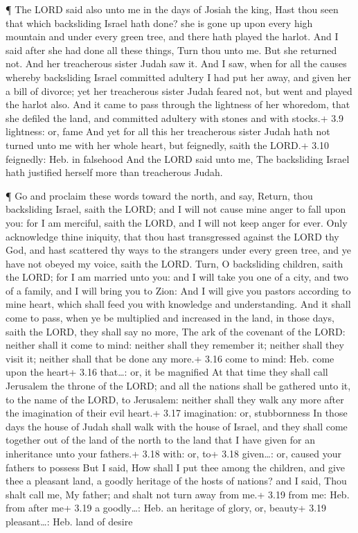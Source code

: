  ¶ The LORD said also unto me in the days of Josiah the
king, Hast thou seen that which backsliding Israel hath done? she is
gone up upon every high mountain and under every green tree, and there
hath played the harlot.  And I said after she had done all
these things, Turn thou unto me. But she returned not. And her
treacherous sister Judah saw it.  And I saw, when for all
the causes whereby backsliding Israel committed adultery I had put her
away, and given her a bill of divorce; yet her treacherous sister Judah
feared not, but went and played the harlot also.  And it
came to pass through the lightness of her whoredom, that she defiled the
land, and committed adultery with stones and with stocks.+ 3.9
lightness: or, fame  And yet for all this her treacherous
sister Judah hath not turned unto me with her whole heart, but
feignedly, saith the LORD.+ 3.10 feignedly: Heb. in falsehood
 And the LORD said unto me, The backsliding Israel hath
justified herself more than treacherous Judah.

 ¶ Go and proclaim these words toward the north, and say,
Return, thou backsliding Israel, saith the LORD; and I will not cause
mine anger to fall upon you: for I am merciful, saith the LORD, and I
will not keep anger for ever.  Only acknowledge thine
iniquity, that thou hast transgressed against the LORD thy God, and hast
scattered thy ways to the strangers under every green tree, and ye have
not obeyed my voice, saith the LORD.  Turn, O backsliding
children, saith the LORD; for I am married unto you: and I will take you
one of a city, and two of a family, and I will bring you to Zion:
 And I will give you pastors according to mine heart, which
shall feed you with knowledge and understanding.  And it
shall come to pass, when ye be multiplied and increased in the land, in
those days, saith the LORD, they shall say no more, The ark of the
covenant of the LORD: neither shall it come to mind: neither shall they
remember it; neither shall they visit it; neither shall that be done any
more.+ 3.16 come to mind: Heb. come upon the heart+ 3.16 that\ldots: or,
it be magnified  At that time they shall call Jerusalem the
throne of the LORD; and all the nations shall be gathered unto it, to
the name of the LORD, to Jerusalem: neither shall they walk any more
after the imagination of their evil heart.+ 3.17 imagination: or,
stubbornness  In those days the house of Judah shall walk
with the house of Israel, and they shall come together out of the land
of the north to the land that I have given for an inheritance unto your
fathers.+ 3.18 with: or, to+ 3.18 given\ldots: or, caused your fathers
to possess  But I said, How shall I put thee among the
children, and give thee a pleasant land, a goodly heritage of the hosts
of nations? and I said, Thou shalt call me, My father; and shalt not
turn away from me.+ 3.19 from me: Heb. from after me+ 3.19 a
goodly\ldots: Heb. an heritage of glory, or, beauty+ 3.19
pleasant\ldots: Heb. land of desire

